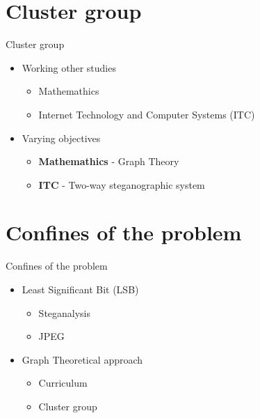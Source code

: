 
\section{Cluster group}
\begin{frame}{Cluster group}{}
	\begin{itemize}
		\item Working other studies
        \begin{itemize}
            \item Mathemathics
            \item Internet Technology and Computer Systems (ITC)
        \end{itemize}
		\item Varying objectives
        \begin{itemize}
            \item \textbf{Mathemathics} - Graph Theory 
            \item \textbf{ITC} - Two-way steganographic system
        \end{itemize}
	\end{itemize}
\end{frame}







\section{Confines of the problem}
\begin{frame}{Confines of the problem}{}
	\begin{itemize}
		\item Least Significant Bit (LSB)
        \begin{itemize}
            \item Steganalysis
            \item JPEG
        \end{itemize}
		\item Graph Theoretical approach
        \begin{itemize}
            \item Curriculum
            \item Cluster group
        \end{itemize}
	\end{itemize}
\end{frame}

